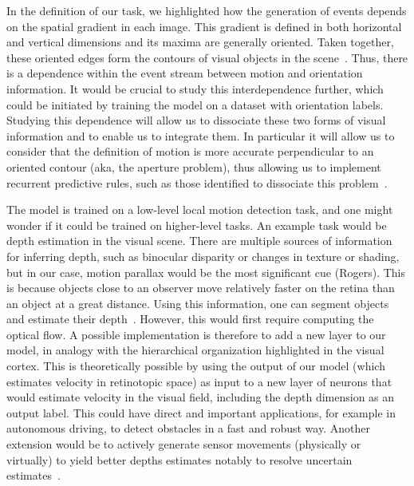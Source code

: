 \documentclass[default]{sn-jnl}%
\theoremstyle{thmstyleone}%
\theoremstyle{thmstyletwo}%
\theoremstyle{thmstylethree}%
\begin{document}
In the definition of our task, we highlighted how the generation of events depends on the spatial gradient in each image. This gradient is defined in both horizontal and vertical dimensions and its maxima are generally oriented. Taken together, these oriented edges form the contours of visual objects in the scene~\citep{koenderink_representation_1987}. Thus, there is a dependence within the event stream between motion and orientation information. It would be crucial to study this interdependence further, which could be initiated by training the model on a dataset with orientation labels. Studying this dependence will allow us to dissociate these two forms of visual information and to enable us to integrate them. In particular it will allow us to consider that the definition of motion is more accurate perpendicular to an oriented contour (aka, the aperture problem), thus allowing us to implement recurrent predictive rules, such as those identified to dissociate this problem~\citep{perrinet_motion-based_2012}.

The model is trained on a low-level local motion detection task, and one might wonder if it could be trained on higher-level tasks. An example task would be depth estimation in the visual scene. There are multiple sources of information for inferring depth, such as binocular disparity or changes in texture or shading, but in our case, motion parallax would be the most significant cue (Rogers). This is because objects close to an observer move relatively faster on the retina than an object at a great distance. Using this information, one can segment objects and estimate their depth~\citep{yoonessi_contribution_2011}. However, this would first require computing the optical flow. A possible implementation is therefore to add a new layer to our model, in analogy with the hierarchical organization highlighted in the visual cortex. This is theoretically possible by using the output of our model (which estimates velocity in retinotopic space) as input to a new layer of neurons that would estimate velocity in the visual field, including the depth dimension as an output label. This could have direct and important applications, for example in autonomous driving, to detect obstacles in a fast and robust way. Another extension would be to actively generate sensor movements (physically or virtually) to yield better depths estimates notably to resolve uncertain estimates~\citep{nawrot_eye_2003}.
\end{document}
